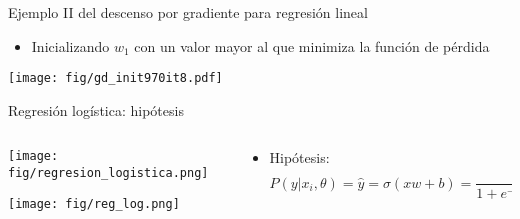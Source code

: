 \documentclass[aspectratio=169,9pt]{beamer}
\begin{document}
\begin{frame}{Ejemplo II del descenso por gradiente para regresión lineal}
\begin{itemize}
	\item Inicializando $w_1$ con un valor mayor al que minimiza la función de pérdida
\end{itemize}
\begin{center}
	\texttt{[image: fig/gd\_init970it8.pdf]}
\end{center}
\end{frame}






\begin{frame}{Regresión logística: hipótesis}
	\begin{columns}
		\begin{column}{0.55\textwidth}
			\begin{flushleft}
				\texttt{[image: fig/regresion\_logistica.png]}
			\end{flushleft}
		\texttt{[image: fig/reg\_log.png]}
		\end{column}
		\begin{column}{0.55\textwidth}
			\begin{itemize}
				\item Hipótesis:
				\begin{equation*}
					P(y|x_i,\theta) = \hat{y}= \sigma(xw + b) =\frac{1}{1 + e^{-(xw + b)}}
				\end{equation*}
			\end{itemize}
		\end{column}
	\end{columns}
\end{frame}
\end{document}
